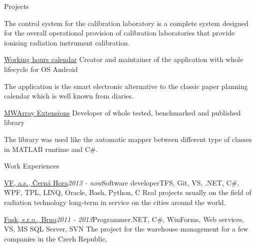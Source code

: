 \documentclass{cv} %
\begin{document}
\begin{rSection}{Projects}
\begin{rSubsection}
The control system for the calibration laboratory is a complete system designed for the overall operational provision of calibration laboratories that provide ionising radiation instrument calibration.
\end{rSubsection}

\begin{rSubsection}
{\href{https://play.google.com/store/apps/details?id=eu.jksoft.planningcalendar}{Working hours calendar}}{}
{Creator and maintainer of the application with whole lifecycle for OS Android}{}

The application is the smart electronic alternative to the classic paper planning calendar which is well known from diaries.
\end{rSubsection}

\begin{rSubsection}
{\href{http://honzakuzel.eu/mwarrayextensions.html}{MWArray Extensions}}{}
{Developer of whole tested, benchmarked and published library}{}

The library was used like the automatic mapper between different type of classes in MATLAB runtime and C\#.
\end{rSubsection}

\end{rSection}


\begin{rSection}{Work Experiences}

\begin{rSubsection}{\href{https://www.vfnuclear.com/en/}{VF, a.s., \v Cern\' a Hora}}{\em 2013 - now}{Software developer}{TFS, Git, VS, .NET, C\#, WPF, TPL, LINQ, Oracle, Bash, Python, C}
Real projects usually on the field of radiation technology long-term in service on the cities around the world.
\end{rSubsection}

\begin{rSubsection}{\href{http://www.fask.cz/}{Fask, s.r.o., Brno}}{\em 2011 - 2013}{Programmer}{.NET, C\#, WinForms, Web services, VS, MS SQL Server, SVN}
The project for the warehouse management for a few companies in the Czech Republic.
\end{rSubsection}

\end{rSection}
\end{document}
